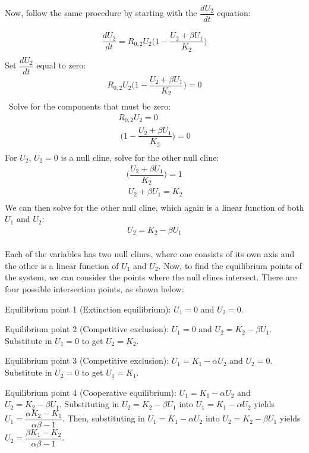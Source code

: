 \documentclass[12pt]{article}
\begin{document}
\begin{flushleft}
Now, follow the same procedure by starting with the $\dfrac{dU_2}{dt}$ equation:
\end{flushleft}
\begin{gather*}
\dfrac{dU_2}{dt} = R_{0,2}U_2\Big(1 - \dfrac{U_2+{\beta}U_1}{K_2}\Big) \\
\end{gather*}
Set $\dfrac{dU_2}{dt}$ equal to zero:
\begin{gather*}
R_{0,2}U_2\Big(1 - \dfrac{U_2+{\beta}U_1}{K_2}\Big) = 0 \\
\end{gather*}\
Solve for the components that must be zero:	
\begin{gather*}
R_{0,2}U_2 = 0\\\
\Big(1 - \dfrac{U_2+{\beta}U_1}{K_2}\Big) = 0\\
\end{gather*}
For $U_2$, $U_2 = 0$ is a null cline, solve for the other null cline:
\begin{gather*}
\Big(\dfrac{U_2+{\beta}U_1}{K_2}\Big) = 1 \\\
U_2+{\beta}U_1 = K_2 \\\
\end{gather*}
We can then solve for the other null cline, which again is a linear function of both $U_1$ and $U_2$:
\begin{gather*}
U_2 = K_2 - {\beta}U_1 \\\
\end{gather*}

Each of the variables has two null clines, where one consists of its own axis and the other is a linear function of $U_1$ and $U_2$. Now, to find the equilibrium points of the system, we can consider the points where the null clines intersect. There are four possible intersection points, as shown below:\\
\begin{flushleft}
Equilibrium point 1 (Extinction equilibrium): $U_1 = 0$ and $U_2 = 0$.\\
\end{flushleft} 
\begin{flushleft}
Equilibrium point 2 (Competitive exclusion): $U_1 = 0$ and $U_2 = K_2 - {\beta}U_1$. Substitute in $U_1 = 0$ to get $U_2 = K_2$. \\
\end{flushleft} 
\begin{flushleft}
Equilibrium point 3 (Competitive exclusion): $U_1 = K_1 - {\alpha}U_2$ and $U_2 = 0$. Substitute in $U_2 = 0$ to get $U_1 = K_1$. \\
\end{flushleft} 
\begin{flushleft}
Equilibrium point 4 (Cooperative equilibrium): $U_1 = K_1 - {\alpha}U_2$ and $U_2 =  K_2 - {\beta}U_1$. Substituting in $U_2 =  K_2 - {\beta}U_1$ into $U_1 = K_1 - {\alpha}U_2$ yields $U_1 = \dfrac{{\alpha}K_2 - K_1}{{\alpha}{\beta} - 1}$.
Then, substituting in $U_1 = K_1 - {\alpha}U_2$ into $U_2 =  K_2 - {\beta}U_1$ yields $U_2 = \dfrac{{\beta}K_1 - K_2}{{\alpha}{\beta} - 1}$. \\
\end{flushleft}  
 
\end{document}

